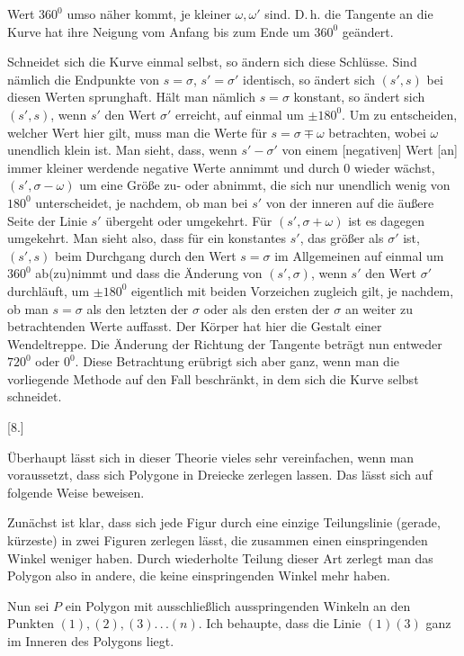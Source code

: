 %
Wert $360^0$ umso näher kommt, je kleiner $\omega, \omega'$ sind. D.\,h. die Tangente an die Kurve hat ihre Neigung vom Anfang bis zum Ende um $360^0$ geändert.

Schneidet sich die Kurve einmal selbst, so ändern sich diese Schlüsse. Sind nämlich die Endpunkte von $s = \sigma$, $s' = \sigma'$ identisch, so ändert sich $(s', s)$ bei diesen Werten sprunghaft. Hält man nämlich $s = \sigma$ konstant, so ändert sich $(s', s)$, wenn $s'$ den Wert $\sigma'$ erreicht, auf einmal um $\pm 180^0$. Um zu entscheiden, welcher Wert hier gilt, muss man die Werte für $s = \sigma \mp \omega$ betrachten, wobei $\omega$ unendlich klein ist. Man sieht, dass, wenn $s' - \sigma'$ von einem [negativen] Wert [an] immer kleiner werdende negative Werte annimmt und durch $0$ wieder wächst, $(s', \sigma - \omega)$ um eine Größe zu- oder abnimmt, die sich nur unendlich wenig von $180^0$ unterscheidet, je nachdem, ob man bei $s'$ von der inneren auf die äußere Seite der Linie $s'$ übergeht oder umgekehrt. Für $(s', \sigma + \omega)$ ist es dagegen umgekehrt. Man sieht also, dass für ein konstantes $s'$, das größer als $\sigma'$ ist, $(s', s)$ beim Durchgang durch den Wert $s = \sigma$ im Allgemeinen auf einmal um $360^0$ ab(zu)nimmt und dass die Änderung von $(s', \sigma)$, wenn $s'$ den Wert $\sigma'$ durchläuft, um $\pm 180^0$ eigentlich mit beiden Vorzeichen zugleich gilt, je nachdem, ob man $s = \sigma$ als den letzten der  $\sigma$ oder als den ersten der  $\sigma$ an weiter zu betrachtenden Werte auffasst. Der Körper hat hier die Gestalt einer Wendeltreppe. Die Änderung der Richtung der Tangente beträgt nun entweder $720^0$ oder $0^0$. Diese Betrachtung erübrigt sich aber ganz, wenn man die vorliegende Methode auf den Fall beschränkt, in dem sich die Kurve  selbst schneidet.

\begin{center}
[8.]
\end{center}

Überhaupt lässt sich in dieser Theorie vieles sehr vereinfachen, wenn man voraussetzt, dass sich Polygone in Dreiecke zerlegen lassen. Das lässt sich auf folgende Weise beweisen.

Zunächst ist klar, dass sich jede Figur durch eine einzige Teilungslinie (gerade, kürzeste) in zwei Figuren zerlegen lässt, die zusammen einen einspringenden Winkel weniger haben. Durch wiederholte Teilung dieser Art zerlegt man das Polygon also in andere, die keine einspringenden Winkel mehr haben.

Nun sei $P$ ein Polygon mit ausschließlich ausspringenden Winkeln an den Punkten $(1), (2), (3) .\,.\,. (n)$. Ich behaupte, dass die Linie $(1)(3)$ ganz im Inneren des Polygons liegt.
